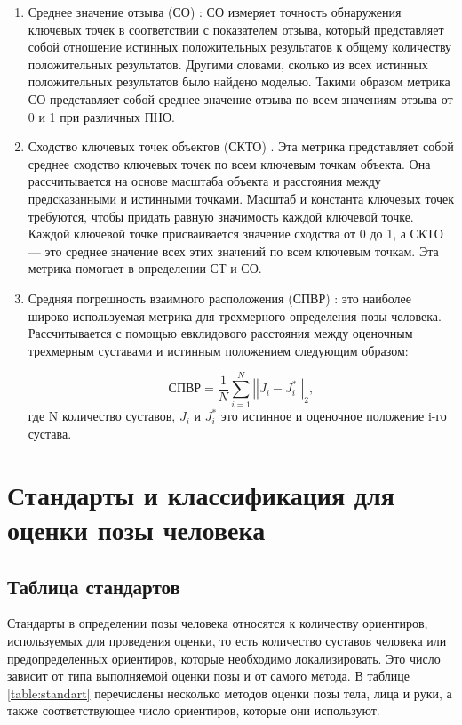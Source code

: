 \begin{enumerate}[label=\arabic*)]
	\item Среднее значение отзыва (СО) \cite{guide-hpe}: СО измеряет точность обнаружения ключевых точек в соответствии с показателем отзыва, который представляет собой отношение истинных положительных результатов к общему количеству положительных результатов.
	Другими словами, сколько из всех истинных положительных результатов было найдено моделью.
	Такими образом метрика СО представляет собой среднее значение отзыва по всем значениям отзыва от 0 и 1 при различных ПНО.
	
	\item Сходство ключевых точек объектов (СКТО) \cite{COCO}. Эта метрика представляет собой среднее сходство ключевых точек по всем ключевым точкам объекта.
	Она рассчитывается на основе масштаба объекта и расстояния между предсказанными и истинными точками.
	Масштаб и константа ключевых точек требуются, чтобы придать равную значимость каждой ключевой точке.
	Каждой ключевой точке присваивается значение сходства от 0 до 1, а СКТО --- это среднее значение всех этих значений по всем ключевым точкам.
	Эта метрика помогает в определении СТ и СО.
	
	\item Средняя погрешность взаимного расположения (СПВР) \cite{COCO}: это наиболее широко используемая метрика для трехмерного определения позы человека.
	Рассчитывается с помощью евклидового расстояния между оценочным трехмерным суставами и истинным положением следующим образом:
	
	\begin{equation}
		\text{СПВР} = \frac{1}{N}\sum_{i=1}^{N} \left| \left| J_i -J_i^*\right| \right|_2,
	\end{equation}
	где N количество суставов, $J_i$ и $J_i^*$ это истинное и оценочное положение i-го сустава.
\end{enumerate}

\section{Стандарты и классификация для оценки позы человека}

\subsection{Таблица стандартов}

Стандарты в определении позы человека относятся к количеству ориентиров, используемых для проведения оценки, то есть количество суставов человека или предопределенных ориентиров, которые необходимо локализировать.
Это число зависит от типа выполняемой оценки позы и от самого метода. В таблице \ref{table:standart} перечислены несколько методов оценки позы тела, лица и руки, а также соответствующее число ориентиров, которые они используют.

